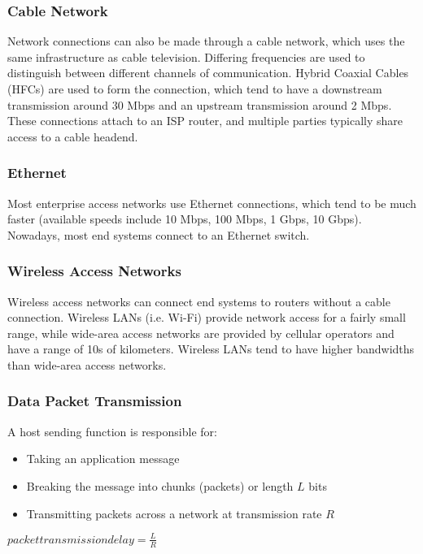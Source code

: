 \documentclass[12pt,titlepage]{article}
\begin{document}
      \subsubsection{Cable Network}
        Network connections can also be made through a cable network, which uses the same infrastructure as cable television.
        Differing frequencies are used to distinguish between different channels of communication. Hybrid Coaxial Cables (HFCs) are
        used to form the connection, which tend to have a downstream transmission around 30 Mbps and an upstream transmission around
        2 Mbps. These connections attach to an ISP router, and multiple parties typically share access to a cable headend.

      \subsubsection{Ethernet}
        Most enterprise access networks use Ethernet connections, which tend to be much faster (available speeds include 10 Mbps, 100 Mbps,
        1 Gbps, 10 Gbps). Nowadays, most end systems connect to an Ethernet switch.

      \subsubsection{Wireless Access Networks}
        Wireless access networks can connect end systems to routers without a cable connection. Wireless LANs (i.e. Wi-Fi) provide network
        access for a fairly small range, while wide-area access networks are provided by cellular operators and have a range of 10s of
        kilometers. Wireless LANs tend to have higher bandwidths than wide-area access networks.

      \subsubsection{Data Packet Transmission}
        A host sending function is responsible for:
          \begin{itemize}
            \item Taking an application message
            \item Breaking the message into chunks (packets) or length $L$ bits
            \item Transmitting packets across a network at transmission rate $R$
          \end{itemize}
      $packet transmission delay = \frac{L}{R}$
\end{document}
